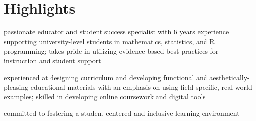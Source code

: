 \documentclass[]{deedy-resume-openfont}
\begin{document}


\flushleft
\section{Highlights}
\vspace{\topsep} %
\begin{tightemize}
\raggedright

\item passionate educator and student success specialist with 6 years experience supporting university-level students in mathematics, statistics, and R programming; takes pride in utilizing evidence-based best-practices for instruction and student support
\item experienced at designing curriculum and developing functional and aesthetically-pleasing educational materials with an emphasis on using field specific, real-world examples;  skilled in developing online coursework and digital tools
\item committed to fostering a student-centered and inclusive learning environment

\end{tightemize}
\end{document}
